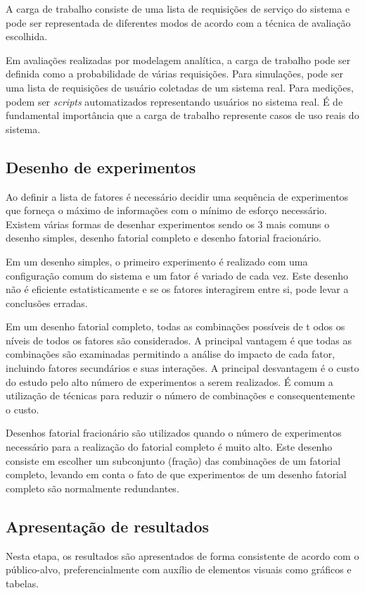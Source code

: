 A carga de trabalho consiste de uma lista de requisições de serviço do sistema e pode ser representada de diferentes modos de acordo com a técnica de avaliação escolhida.

Em avaliações realizadas por modelagem analítica, a carga de trabalho pode ser definida como a probabilidade de várias requisições. Para simulações, pode ser uma lista de requisições de usuário coletadas de um sistema real. Para medições, podem ser \textit{scripts} automatizados representando usuários no sistema real. É de fundamental importância que a carga de trabalho represente casos de uso reais do sistema.

\subsection{Desenho de experimentos}

Ao definir a lista de fatores é necessário decidir uma sequência de experimentos que forneça o máximo de informações com o mínimo de esforço necessário. Existem várias formas de desenhar experimentos sendo os 3 mais comuns o desenho simples, desenho fatorial completo e desenho fatorial fracionário.

Em um desenho simples, o primeiro experimento é realizado com uma configuração comum do sistema e um fator é variado de cada vez. Este desenho não é eficiente estatisticamente e se os fatores interagirem entre si, pode levar a conclusões erradas.

Em um desenho fatorial completo, todas as combinações possíveis de t odos os níveis de todos os fatores são considerados. A principal vantagem é que todas as combinações são examinadas permitindo a análise do impacto de cada fator, incluindo fatores secundários e suas interações. A principal desvantagem é o custo do estudo pelo alto número de experimentos a serem realizados. É comum a utilização de técnicas para reduzir o número de combinações e consequentemente o custo.

Desenhos fatorial fracionário são utilizados quando o número de experimentos necessário para a realização do fatorial completo é muito alto. Este desenho consiste em escolher um subconjunto (fração) das combinações de um fatorial completo, levando em conta o fato de que experimentos de um desenho fatorial completo são normalmente redundantes.

\subsection{Apresentação de resultados}

Nesta etapa, os resultados são apresentados de forma consistente de acordo com o público-alvo, preferencialmente com auxílio de elementos visuais como gráficos e tabelas.